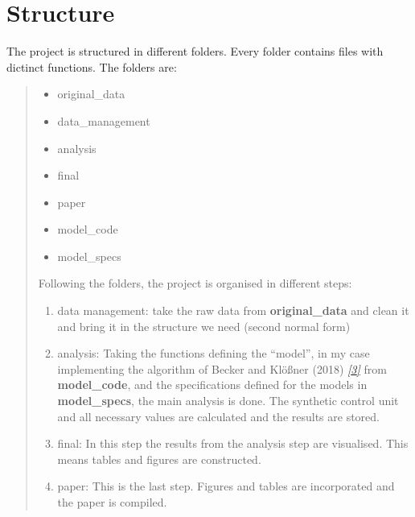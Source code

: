 \documentclass[a4paper,11pt,english]{sphinxmanual}
\begin{document}
\section{Structure}
\label{introduction:structure}
The project is structured in different folders. Every folder contains files with dictinct functions.
The folders are:
\begin{quote}
\begin{itemize}
\item {} 
original\_data

\item {} 
data\_management

\item {} 
analysis

\item {} 
final

\item {} 
paper

\item {} 
model\_code

\item {} 
model\_specs

\end{itemize}

Following the folders, the project is organised in different steps:
\begin{enumerate}
\item {} 
data management: take the raw data from \textbf{original\_data} and clean it and bring it in the structure we need (second normal form)

\item {} 
analysis: Taking the functions defining the ``model'', in my case implementing the algorithm of Becker and Klößner (2018) \label{introduction:id6}{\hyperref[references:becker2018]{\emph{{[}3{]}}}} from \textbf{model\_code}, and the specifications defined for the models in \textbf{model\_specs}, the main analysis is done. The synthetic control unit and all necessary values are calculated and the results are stored.

\item {} 
final: In this step the results from the analysis step are visualised. This means tables and figures are constructed.

\item {} 
paper: This is the last step. Figures and tables are incorporated and the paper is compiled.

\end{enumerate}
\end{quote}
\end{document}

